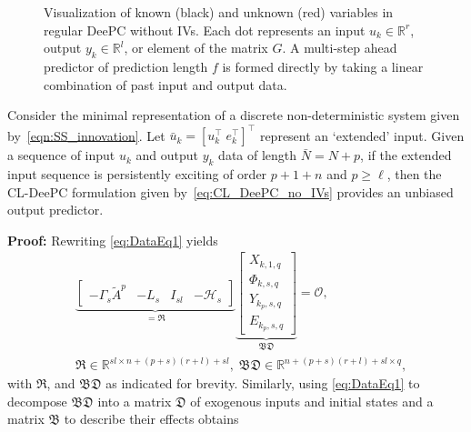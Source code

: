 \begin{figure}[b!]
\centering

\caption{Visualization of known (black) and unknown (red) variables in regular \ac{DeePC} without \ac{IVs}. Each dot represents an input $u_k\in\mathbb{R}^r$, output $y_k\in\mathbb{R}^l$, or element of the matrix $G$. A multi-step ahead predictor of prediction length $f$ is formed directly by taking a linear combination of past input and output data.\\\vspace{0.75mm}}
\label{fig:regular-DeePC}
\end{figure}
%
\begin{thm}\label{theorem:main_result}
    Consider the minimal representation of a discrete non-deterministic system given by~\eqref{eqn:SS_innovation}. Let $\bar{u}_k=\left[u_k^\top \; e_k^\top\right]^\top$ represent an `extended' input. Given a sequence of input $u_k$ and output $y_k$ data of length $\bar{N}=N+p$, if the extended input sequence is persistently exciting of order $p+1+n$ and $p\geq\ell$, then the \ac{CL-DeePC} formulation given by~\eqref{eq:CL_DeePC_no_IVs} provides an unbiased output predictor.%
\end{thm}
\textbf{Proof:} 
Rewriting \eqref{eq:DataEq1} yields
\begin{align*}
    &\underbrace{\begin{bmatrix}-\Gamma_s \tilde{A}^p & -L_s & I_{sl}&-\mathcal{H}_s\end{bmatrix}}_{= \mathfrak{R}}
    \underbrace{\begin{bmatrix}
        X_{k,1,q}\\
        \Phi_{k,s,q}\\
        Y_{k_p,s,q}\\
        E_{k_p,s,q}
    \end{bmatrix}}_{\mathfrak{B}\mathfrak{D}}=\mathcal{O},\\
    &\mathfrak{R}\in\mathbb{R}^{sl\times n+(p+s)(r+l)+sl},\;\mathfrak{BD}\in\mathbb{R}^{n+(p+s)(r+l)+sl \times q},
\end{align*}
with $\mathfrak{R}$, and $\mathfrak{BD}$ as indicated for brevity. Similarly, using \eqref{eq:DataEq1} to decompose $\mathfrak{BD}$ into a matrix $\mathfrak{D}$ of exogenous inputs and initial states and a matrix $\mathfrak{B}$ to describe their effects obtains
